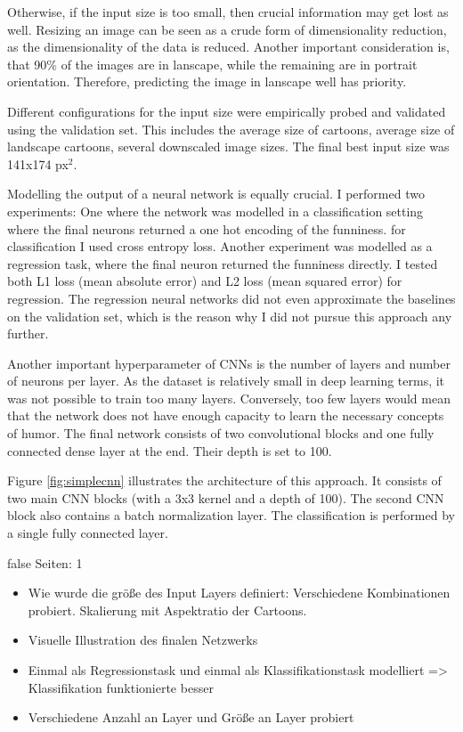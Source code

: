 \documentclass[draft,final,oneside]{vutinfth} %
\begin{document}
Otherwise, if the input size is too small, then crucial information may get lost as well. Resizing an image can be seen as a crude form of dimensionality reduction, as the dimensionality of the data is reduced. Another important consideration is, that 90\% of the images are in lanscape, while the remaining are in portrait orientation. Therefore, predicting the image in lanscape well has priority.

Different configurations for the input size were empirically probed and validated using the validation set. This includes the average size of cartoons, average size of landscape cartoons, several downscaled image sizes. The final best input size was 141x174 px$^2$.

Modelling the output of a neural network is equally crucial. I performed two experiments: One where the network was modelled in a classification setting where the final neurons returned a one hot encoding of the funniness. for classification I used cross entropy loss. Another experiment was modelled as a  regression task, where the final neuron returned the funniness directly. I tested both L1 loss (mean absolute error) and L2 loss (mean squared error) for regression. The regression neural networks did not even approximate the baselines on the validation set, which is the reason why I did not pursue this approach any further.

Another important hyperparameter of CNNs is the number of layers and number of neurons per layer. As the dataset is relatively small in deep learning terms, it was not possible to train too many layers. Conversely, too few layers would mean that the network does not have enough capacity to learn the necessary concepts of humor. The final network consists of two convolutional blocks and one fully connected dense layer at the end. Their depth is set to 100.

Figure \ref{fig:simplecnn} illustrates the architecture of this approach. It consists of two main CNN blocks (with a 3x3 kernel and a depth of 100). The second CNN block also contains a batch normalization layer. The classification is performed by a single fully connected layer.

\if false
Seiten: 1

\begin{itemize}
\item Wie wurde die größe des Input Layers definiert: Verschiedene Kombinationen probiert. Skalierung mit Aspektratio der Cartoons. 
\item Visuelle Illustration des finalen Netzwerks
\item Einmal als Regressionstask und einmal als Klassifikationstask modelliert => Klassifikation funktionierte besser
\item Verschiedene Anzahl an Layer und Größe an Layer probiert
\end{itemize}
\end{document}
